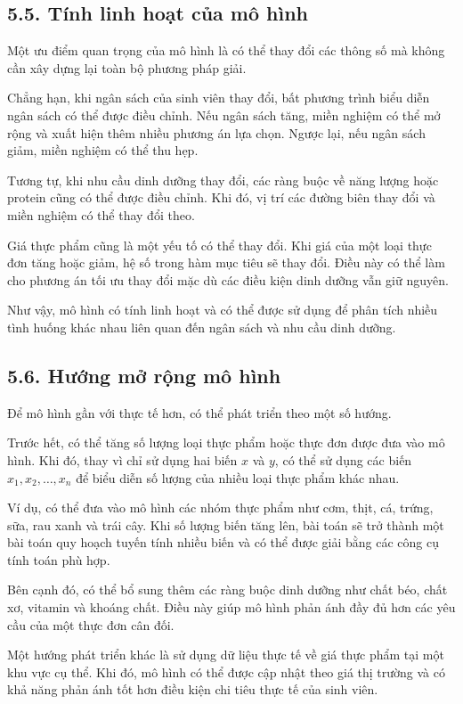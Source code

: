 \documentclass[12pt,a4paper]{article}
\begin{document}
\subsection*{5.5. Tính linh hoạt của mô hình}

Một ưu điểm quan trọng của mô hình là có thể thay đổi các thông số
mà không cần xây dựng lại toàn bộ phương pháp giải.

Chẳng hạn, khi ngân sách của sinh viên thay đổi, bất phương trình
biểu diễn ngân sách có thể được điều chỉnh. Nếu ngân sách tăng, miền
nghiệm có thể mở rộng và xuất hiện thêm nhiều phương án lựa chọn.
Ngược lại, nếu ngân sách giảm, miền nghiệm có thể thu hẹp.

Tương tự, khi nhu cầu dinh dưỡng thay đổi, các ràng buộc về năng
lượng hoặc protein cũng có thể được điều chỉnh. Khi đó, vị trí các
đường biên thay đổi và miền nghiệm có thể thay đổi theo.

Giá thực phẩm cũng là một yếu tố có thể thay đổi. Khi giá của một loại
thực đơn tăng hoặc giảm, hệ số trong hàm mục tiêu sẽ thay đổi. Điều
này có thể làm cho phương án tối ưu thay đổi mặc dù các điều kiện
dinh dưỡng vẫn giữ nguyên.

Như vậy, mô hình có tính linh hoạt và có thể được sử dụng để phân
tích nhiều tình huống khác nhau liên quan đến ngân sách và nhu cầu
dinh dưỡng.

\subsection*{5.6. Hướng mở rộng mô hình}

Để mô hình gần với thực tế hơn, có thể phát triển theo một số hướng.

Trước hết, có thể tăng số lượng loại thực phẩm hoặc thực đơn được đưa
vào mô hình. Khi đó, thay vì chỉ sử dụng hai biến $x$ và $y$, có thể
sử dụng các biến $x_1,x_2,\ldots,x_n$ để biểu diễn số lượng của nhiều
loại thực phẩm khác nhau.

Ví dụ, có thể đưa vào mô hình các nhóm thực phẩm như cơm, thịt, cá,
trứng, sữa, rau xanh và trái cây. Khi số lượng biến tăng lên, bài toán
sẽ trở thành một bài toán quy hoạch tuyến tính nhiều biến và có thể
được giải bằng các công cụ tính toán phù hợp.

Bên cạnh đó, có thể bổ sung thêm các ràng buộc dinh dưỡng như chất
béo, chất xơ, vitamin và khoáng chất. Điều này giúp mô hình phản ánh
đầy đủ hơn các yêu cầu của một thực đơn cân đối.

Một hướng phát triển khác là sử dụng dữ liệu thực tế về giá thực phẩm
tại một khu vực cụ thể. Khi đó, mô hình có thể được cập nhật theo giá
thị trường và có khả năng phản ánh tốt hơn điều kiện chi tiêu thực tế
của sinh viên.
\end{document}
